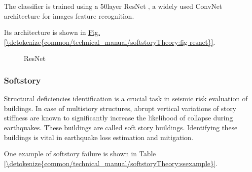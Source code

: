 \documentclass[letterpaper,10pt,english]{sphinxmanual}
\begin{document}
\sphinxAtStartPar
The classifier is trained using a 50\sphinxhyphen{}layer ResNet , a widely used ConvNet architecture for images feature recognition.

\sphinxAtStartPar
Its architecture is shown in \hyperref[\detokenize{common/technical_manual/softstoryTheory:fig-resnet}]{Fig.\@ \ref{\detokenize{common/technical_manual/softstoryTheory:fig-resnet}}}.

\begin{figure}[htbp]
\centering
\capstart

\noindent{}
\caption{ResNet}\label{\detokenize{common/technical_manual/occupancyTheory:id6}}\label{\detokenize{common/technical_manual/occupancyTheory:fig-resnet}}\end{figure}


\subsubsection{Soft\sphinxhyphen{}story}
\label{\detokenize{common/technical_manual/softstoryTheory:soft-story}}\label{\detokenize{common/technical_manual/softstoryTheory:softstorytheory}}\label{\detokenize{common/technical_manual/softstoryTheory::doc}}
\sphinxAtStartPar
Structural deficiencies identification is a crucial task in seismic risk evaluation of buildings.
In case of multi\sphinxhyphen{}story structures, abrupt vertical variations of story stiffness are known to significantly increase the likelihood of collapse during earthquakes.
These buildings are called soft story buildings.
Identifying these buildings is vital in earthquake loss estimation and mitigation.

\sphinxAtStartPar
One example of soft\sphinxhyphen{}story failure is shown in \hyperref[\detokenize{common/technical_manual/softstoryTheory:ssexample}]{Table \ref{\detokenize{common/technical_manual/softstoryTheory:ssexample}}}.
\end{document}
